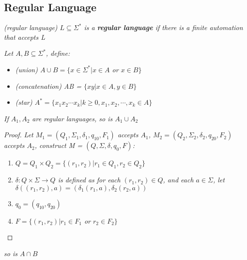\documentclass{article}
\begin{document}
\subsection{Regular Language}
\begin{defn}
    \textit{(regular language) $L \subseteq \Sigma^*$ is a \textbf{regular language} if there is a finite automation that accepts L}

    \textit{Let $A,B\subseteq\Sigma^*$, define:}

    \begin{itemize}
        \item \textit{(union) $A\cup B = \{x\in \Sigma^*|x\in A$ or $x\in B\}$}
        \item \textit{(concatenation) AB = $\{xy|x\in A,y\in B\}$}
        \item \textit{(star) $A^* = \{x_1x_2\cdots x_k| k\geq 0,x_1,x_2,\cdots,x_k\in A\}$}
    \end{itemize}
\end{defn}

\begin{thm}
    \textit{If $A_1,A_2$ are regular languages, so is $A_1\cup A_2$}

    \begin{proof}
        \textit{Let $M_1 = (Q_1,\Sigma_1,\delta_1,q_{10},F_1)$ accepts $A_1$, $M_2 = (Q_2,\Sigma_2,\delta_2,q_{20},F_2)$ accepts $A_2$, construct M = $(Q,\Sigma,\delta,q_0,F)$:}
        \begin{enumerate}
            \item $Q = Q_1\times Q_2 = \{(r_1,r_2)|r_1\in Q_1,r_2\in Q_2\}$
            \item \textit{$\delta:Q\times \Sigma \rightarrow Q$ is defined as for each $(r_1,r_2)\in Q$, and each $a \in \Sigma$, let $\delta ((r_1,r_2),a) = (\delta_1(r_1,a),\delta_2(r_2,a))$}
            \item $q_0 = (q_{10},q_{20})$
            \item \textit{$F = \{(r_1,r_2)|r_1\in F_1$ or $r_2\in F_2\}$}
        \end{enumerate}
    \end{proof}
    \begin{remark}
        \textit{so is $A\cap B$}
    \end{remark}
\end{thm}
\end{document}
